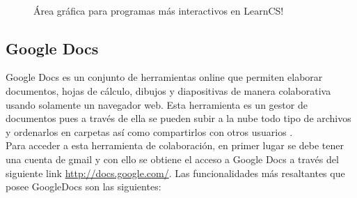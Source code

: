 \begin{figure}[!h]
  \centering

  \caption[LearnCS]{Área gráfica para programas más interactivos en LearnCS!}

    \\
      \label{fig:learncs2}
\end{figure}

\subsection{Google Docs}

Google Docs es un conjunto de herramientas online que permiten elaborar documentos, hojas de cálculo, dibujos y diapositivas de manera colaborativa usando solamente un navegador web. Esta herramienta es un gestor de documentos pues a través de ella se pueden subir a la nube todo tipo de archivos y ordenarlos en carpetas así como compartirlos con otros usuarios \cite{googledocs}.\\

Para acceder a esta herramienta de colaboración, en primer lugar se debe tener una cuenta de gmail y con ello se obtiene el acceso a Google Docs a través del siguiente link \url{http://docs.google.com/}. Las funcionalidades más resaltantes que posee GoogleDocs son las siguientes: \cite{googledocs}\\

